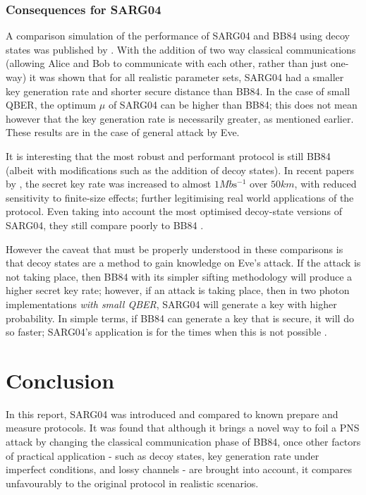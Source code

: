 \documentclass[paper=a4, fontsize=11pt]{scrartcl} %
\numberwithin{equation}{section} %
\numberwithin{figure}{section} %
\numberwithin{table}{section} %
\begin{document}
\subsubsection*{Consequences for SARG04}

A comparison simulation of the performance of SARG04 and BB84 using decoy states was published by \citet{perf2protocols}. With the
addition of two way classical communications (allowing Alice and Bob to communicate with each other, rather than just
one-way) it was shown that for all realistic parameter sets, SARG04 had a smaller key generation rate and shorter secure
distance than BB84. In the case of small QBER, the optimum $\mu$ of SARG04 can be higher than BB84; this does not mean
however that the key generation rate is necessarily greater, as mentioned earlier. These results are in the case of general
attack by Eve.

It is interesting that the most robust and performant protocol is still BB84 (albeit with modifications such as the addition of
decoy states). In recent papers by \citet{recentDecoyBounds, recentDecoy}, the secret key rate was increased to almost $1\si{Mb \s^{-1}}$
over $50\si{km}$, with reduced sensitivity to finite-size effects; further legitimising real world applications of the protocol.
Even taking into account the most optimised decoy-state versions of SARG04, they still compare poorly to BB84 \citep{recentDecoySARG04}.

However the caveat that must be properly understood in these comparisons is that decoy states are a method to
gain knowledge on Eve's attack. If the attack is not taking place, then BB84 with its simpler sifting methodology
will produce a higher secret key rate; however, if an attack is taking place, then in two photon implementations
\textit{with small QBER}, SARG04 will generate a key with higher probability. In simple terms,
if BB84 can generate a key that is secure, it will do so faster; SARG04's application is for the times when this is
not possible \citep{perf2protocols, reviewScariani}.

\clearpage
\section{Conclusion}
In this report, SARG04 was introduced and compared to known prepare and measure protocols. It was found that although
it brings a novel way to foil a PNS attack by changing the classical communication phase of BB84, once other factors
of practical application - such as decoy states, key generation rate under imperfect conditions, and lossy channels -
are brought into account, it compares unfavourably to the original protocol in realistic scenarios.
\end{document}
